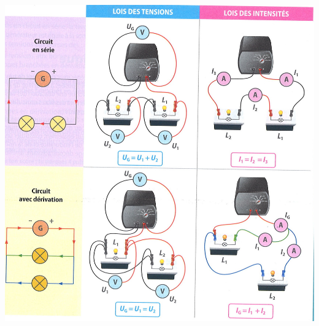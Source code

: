 \documentclass[12pt,a4paper]{article}
\begin{document}
\begin{center}
	\includegraphics[scale=0.7]{img/lois_elec}
\end{center}
\appendix



%
\end{document}
